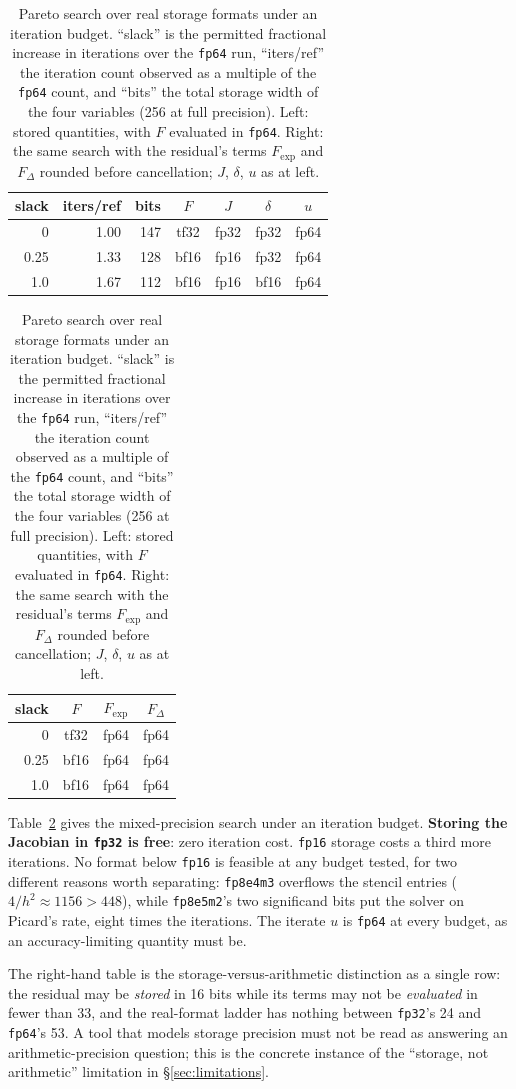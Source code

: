 \documentclass[11pt]{article}
\begin{document}
\begin{table}[t]
\centering\small
\begin{tabular}{@{}rrrcccc@{}}
\toprule
slack & iters/ref & bits & $F$ & $J$ & $\delta$ & $u$\\
\midrule
0    & 1.00 & 147 & tf32 & fp32 & fp32 & fp64\\
0.25 & 1.33 & 128 & bf16 & fp16 & fp32 & fp64\\
1.0  & 1.67 & 112 & bf16 & fp16 & bf16 & fp64\\
\bottomrule
\end{tabular}
\qquad
\begin{tabular}{@{}rccc@{}}
\toprule
slack & $F$ & $F_{\exp}$ & $F_{\Delta}$\\
\midrule
0    & tf32 & fp64 & fp64\\
0.25 & bf16 & fp64 & fp64\\
1.0  & bf16 & fp64 & fp64\\
\bottomrule
\end{tabular}
\caption{Pareto search over real storage formats under an iteration budget.
``slack'' is the permitted fractional increase in iterations over the
\texttt{fp64} run, ``iters/ref'' the iteration count observed as a multiple of
the \texttt{fp64} count, and ``bits'' the total storage width of the four
variables (256 at full precision). Left: stored quantities, with $F$ evaluated
in \texttt{fp64}. Right: the same search with the residual's terms $F_{\exp}$
and $F_{\Delta}$ rounded before cancellation; $J$, $\delta$, $u$ as at left.}
\label{tab:bratu-pareto}
\end{table}

Table~\ref{tab:bratu-pareto} gives the mixed-precision search under an
iteration budget. \textbf{Storing the Jacobian in \texttt{fp32} is free}: zero
iteration cost. \texttt{fp16} storage costs a third more iterations. No format
below \texttt{fp16} is feasible at any budget tested, for two different reasons
worth separating: \texttt{fp8e4m3} overflows the stencil entries
($4/h^2 \approx 1156 > 448$), while \texttt{fp8e5m2}'s two significand bits put
the solver on Picard's rate, eight times the iterations. The iterate $u$ is
\texttt{fp64} at every budget, as an accuracy-limiting quantity must be.

The right-hand table is the storage-versus-arithmetic distinction as a single
row: the residual may be \emph{stored} in 16 bits while its terms may not be
\emph{evaluated} in fewer than 33, and the real-format ladder has nothing between
\texttt{fp32}'s 24 and \texttt{fp64}'s 53. A tool that models storage precision
must not be read as answering an arithmetic-precision question; this is the
concrete instance of the ``storage, not arithmetic'' limitation in
\S\ref{sec:limitations}.
\end{document}

